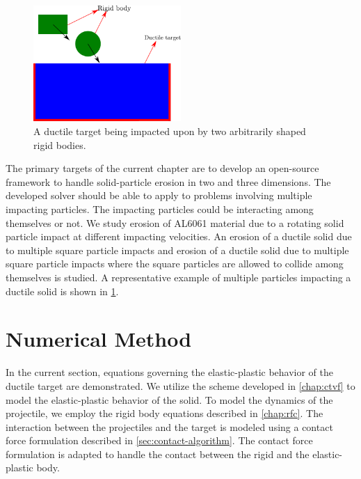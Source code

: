 \begin{figure}[!htpb]
  \centering
  \includegraphics[width=0.5\textwidth]{images/erosion/images/intro/intro_description}
  \caption{A ductile target being impacted upon by two arbitrarily shaped rigid bodies.}
\label{fig:spe-intro}
\end{figure}
The primary targets of the current chapter are to develop an open-source
framework to handle solid-particle erosion in two and three dimensions. The
developed solver should be able to apply to problems involving multiple
impacting particles. The impacting particles could be interacting among
themselves or not. We study erosion of AL6061 material due to a rotating solid
particle impact at different impacting velocities. An erosion of a ductile solid
due to multiple square particle impacts and erosion of a ductile solid due to
multiple square particle impacts where the square particles are allowed to
collide among themselves is studied. A representative example of multiple
particles impacting a ductile solid is shown in \cref{fig:spe-intro}.


\FloatBarrier%
\section{Numerical Method}
\label{sec:erosion-numerical-method}
In the current section, equations governing the elastic-plastic behavior of the
ductile target are demonstrated. We utilize the scheme developed in
\cref{chap:ctvf} to model the elastic-plastic behavior of the solid. To model
the dynamics of the projectile, we employ the rigid body equations described in
\cref{chap:rfc}. The interaction between the projectiles and the target is
modeled using a contact force formulation described in
\cref{sec:contact-algorithm}. The contact force formulation is adapted to handle
the contact between the rigid and the elastic-plastic body.
